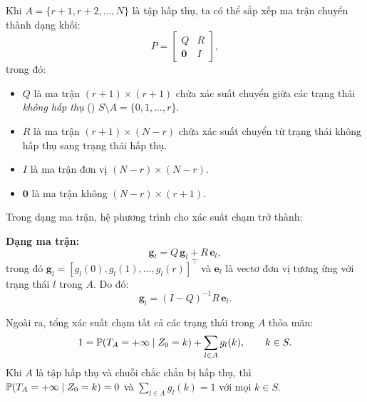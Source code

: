 Khi $A = \{r+1, r+2, \ldots, N\}$ là tập hấp thụ, ta có thể sắp xếp ma trận chuyển thành dạng khối:
\begin{equation}\label{eq:block-matrix}
  P = \begin{bmatrix} Q & R \\ \mathbf{0} & I \end{bmatrix},
\end{equation}
trong đó:
\begin{itemize}[nosep]
  \item $Q$ là ma trận $(r+1) \times (r+1)$ chứa xác suất chuyển giữa các trạng thái \emph{không hấp thụ}
        () $S \setminus A = \{0, 1, \ldots, r\}$.
  \item $R$ là ma trận $(r+1) \times (N-r)$ chứa xác suất chuyển từ trạng thái không hấp thụ sang trạng thái hấp thụ.
  \item $I$ là ma trận đơn vị $(N-r) \times (N-r)$.
  \item $\mathbf{0}$ là ma trận không $(N-r) \times (r+1)$.
\end{itemize}

Trong dạng ma trận, hệ phương trình cho xác suất chạm trở thành:

\begin{congthuc}
\textbf{Dạng ma trận:}
\[
  \mathbf{g}_l = Q\, \mathbf{g}_l + R\, \mathbf{e}_l,
\]
trong đó $\mathbf{g}_l = [g_l(0), g_l(1), \ldots, g_l(r)]^\top$ và $\mathbf{e}_l$ là vectơ đơn vị
tương ứng với trạng thái $l$ trong $A$. Do đó:
\[
  \boxed{
    \mathbf{g}_l = (I - Q)^{-1} R\, \mathbf{e}_l.
  }
\]
\end{congthuc}

Ngoài ra, tổng xác suất chạm tất cả các trạng thái trong $A$ thỏa mãn:
\begin{equation}\label{eq:total-hitting}
  1 = \mathbb{P}(T_A = +\infty \mid Z_0 = k) + \sum_{l \in A} g_l(k), \qquad k \in S.
\end{equation}
Khi $A$ là tập hấp thụ và chuỗi chắc chắn bị hấp thụ, thì $\mathbb{P}(T_A = +\infty \mid Z_0 = k) = 0$
và $\sum_{l \in A} g_l(k) = 1$ với mọi $k \in S$.

